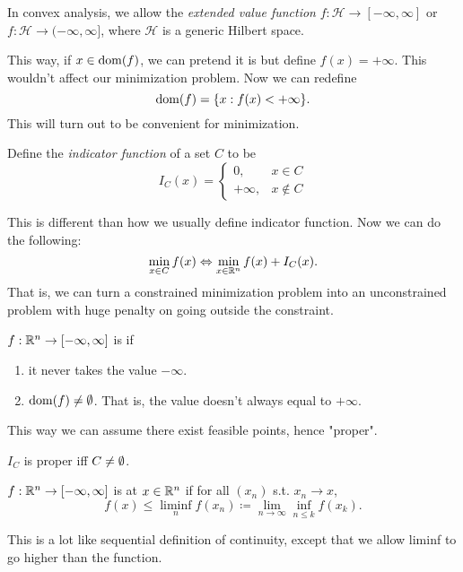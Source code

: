 \documentclass[class=article,crop=false]{standalone}
\begin{document}
\begin{remark}
	In convex analysis, we allow the \emph{extended value function} $ f: \mathcal{H} \to [-\infty,\infty]$ or $ f: \mathcal{H} \to (-\infty,\infty]$, where $ \mathcal{ H}$ is a generic Hilbert space. 

	This way, if $ x \in \operatorname{dom}(f)$, we can pretend it is but define $ f(x) = +\infty$. This wouldn't affect our minimization problem. Now we can redefine
	\[
		\operatorname{dom}(f) = \{x: f(x)< + \infty\} 
	.\] 
	This will turn out to be convenient for minimization.
\end{remark}
\begin{eg}
Define the \emph{indicator function} of a set $ C$ to be
 \begin{equation*}
	 I_C(x) =
\begin{cases}
	0,& x \in C\\
	+\infty,& x \not\in C
\end{cases}
\end{equation*}

This is different than how we usually define indicator function. Now we can do the following:
\[
	\min_{x \in C} f(x) \Leftrightarrow \min_{x \in \mathbb{R}^{n}} f(x) + I_C(x)
.\] 
That is, we can turn a constrained minimization problem into an unconstrained problem with huge penalty on going outside the constraint. 
\end{eg}

\begin{defn}
	$ f: \mathbb{R}^{n} \to [-\infty,\infty]$ is  if
	\begin{enumerate}[label=\arabic*)]
		\item it never takes the value $ -\infty$.
		\item $ \operatorname{dom}(f) \neq \emptyset$. That is, the value doesn't always equal to $ + \infty$.
	\end{enumerate}
\end{defn}
\begin{note}
This way we can assume there exist feasible points, hence "proper".
\end{note}
\begin{eg}
$ I_C$ is proper iff  $ C \neq \emptyset$.
\end{eg}

\begin{defn} 
	$ f: \mathbb{R}^{n} \to [-\infty,\infty]$ is  at $ x \in \mathbb{R}^{n}$ if for all $ (x_n)$ s.t. $ x_n \to x$,
	\[
		f(x) \leq \liminf_n f(x_n) \coloneqq \lim_{ n \to \infty} \inf_{n\leq k} f(x_k)
	.\] 
\end{defn}
\begin{intuition}
This is a lot like sequential definition of continuity, except that we allow liminf to go higher than the function.
\end{intuition}
\end{document}
